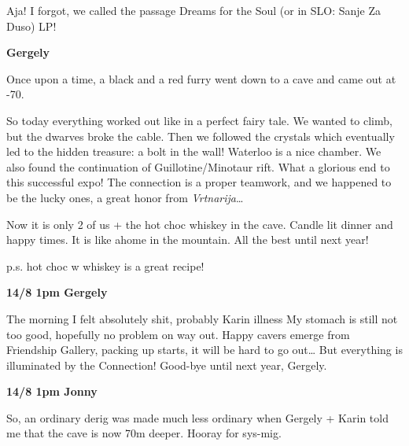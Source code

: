 Aja! I forgot, we called the passage Dreams for the Soul (or in SLO:
Sanje Za Duso) LP!

\textbf{Gergely}

Once upon a time, a black and a red furry went down to a cave and came
out at -70.

So today everything worked out like in a perfect fairy tale. We wanted
to climb, but the dwarves broke the cable. Then we followed the crystals
which eventually led to the hidden treasure: a bolt in the wall!
Waterloo is a nice chamber. We also found the continuation of
Guillotine/Minotaur rift. What a glorious end to this successful expo!
The connection is a proper teamwork, and we happened to be the lucky
ones, a great honor from \emph{Vrtnarija}\ldots{}

Now it is only 2 of us + the hot choc whiskey in the cave. Candle lit
dinner and happy times. It is like ahome in the mountain. All the best
until next year!

p.s. hot choc w whiskey is a great recipe!

\textbf{14/8 1pm Gergely}

The morning I felt absolutely shit, probably Karin illness My stomach is
still not too good, hopefully no problem on way out. Happy cavers emerge
from Friendship Gallery, packing up starts, it will be hard to go
out\ldots{} But everything is illuminated by the Connection! Good-bye
until next year, Gergely.

\textbf{14/8 1pm Jonny}

So, an ordinary derig was made much less ordinary when Gergely + Karin
told me that the cave is now 70m deeper. Hooray for sys-mig.
